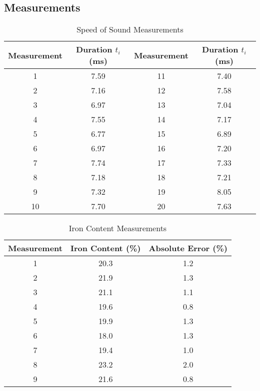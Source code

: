\begin{appendix}
	\section{Measurements}
	\label{sec:Measurements}
	\begin{table}[H]
		\centering
		\begin{tabular}{c|c||c|c}
			Measurement & Duration $t_i$ (ms) & Measurement & Duration $t_i$ (ms) \\
			\hline\hline
			1 & 7.59 & 11 & 7.40 \\ \hline
			2 & 7.16 & 12 & 7.58 \\ \hline
			3 & 6.97 & 13 & 7.04 \\ \hline
			4 & 7.55 & 14 & 7.17 \\ \hline
			5 & 6.77 & 15 & 6.89 \\ \hline
			6 & 6.97 & 16 & 7.20 \\ \hline
			7 & 7.74 & 17 & 7.33 \\ \hline
			8 & 7.18 & 18 & 7.21 \\ \hline
			9 & 7.32 & 19 & 8.05 \\ \hline
			10 & 7.70 & 20 & 7.63 \\ \hline
		\end{tabular}
		\caption{Speed of Sound Measurements}
		\label{tab:Speed_of_Sound_Measurements}
	\end{table}

	\begin{table}[H]
		\centering
		\begin{tabular}{c|c|c}
			Measurement & Iron Content (\%) & Absolute Error (\%) \\
			\hline\hline
			1 & 20.3 & 1.2 \\ \hline
			2 & 21.9 & 1.3 \\ \hline
			3 & 21.1 & 1.1 \\ \hline
			4 & 19.6 & 0.8 \\ \hline
			5 & 19.9 & 1.3 \\ \hline
			6 & 18.0 & 1.3 \\ \hline
			7 & 19.4 & 1.0 \\ \hline
			8 & 23.2 & 2.0 \\ \hline
			9 & 21.6 & 0.8 \\ \hline
		\end{tabular}
		\caption{Iron Content Measurements}
		\label{tab:Iron_Content_Measurements}
	\end{table}


\end{appendix}
